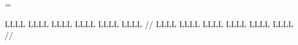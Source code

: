 
\makeatletter

\newdimen\ep@cascadeindent
\newdimen\ep@hangindentamount
\newcount\ep@cascadecount

\ep@cascadeindent=0pt
\ep@hangindentamount=\ling@glhangindent

\parindent=0pt
\def\makeshape#1#2{{%
   \count0=#1
   \ep@dima=#2
   \ep@dimb=\hsize
   \advance\ep@dimb by -\ep@dima
   \edef\cascadeshape{}
   \loop\ifnum\count0 >0
      \edef\cascadeshape{\cascadeshape \the\ep@dima\space\the\ep@dimb\space}%
      \advance\ep@dima by \ling@glhangindent
      \advance\ep@dimb by -\ling@glhangindent
      \advance\count0 by -1
      \repeat
   \edef\next{#1\space\cascadeshape}%
   \xdef\next{\noexpand\expandafter\noexpand\parshape#1\space\cascadeshape}}%
   \next
   \ignorespaces
}
\def\@glhangcarry{%
   \par
   \edef\next{\the\prevgraf}%
   \advance\ep@cascadecount by -\next
   \advance\ep@cascadeindent by \next\ep@hangindentamount
   \makeshape{\ep@cascadecount}{\ep@cascadeindent}
}





\makeatletter
\newtoks\mytoks
\def\@showtoks{\@getoptionalarg\@showtoks@i}
\def\@showtoks@i #1{\mytoks=\expandafter{#1}\writeln{%
   \@optionalarg\the\mytoks}}
\let\showtoks=\@showtoks


\ex[everygla=,glwidth=2in,autoglskip=true,glstruts=true,extraglskip=0pt,
   gllineskip=0pt]
\begingl
\gla
LLLL LLLL LLLL
LLLL LLLL LLLL
//
\glb
LLLL LLLL LLLL
LLLL LLLL LLLL
//
\endgl
\xe

